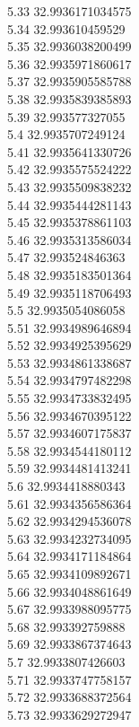 {5.33	32.9936171034575\\
5.34	32.993610459529\\
5.35	32.9936038200499\\
5.36	32.9935971860617\\
5.37	32.9935905585788\\
5.38	32.9935839385893\\
5.39	32.993577327055\\
5.4	32.9935707249124\\
5.41	32.9935641330726\\
5.42	32.9935575524222\\
5.43	32.9935509838232\\
5.44	32.9935444281143\\
5.45	32.9935378861103\\
5.46	32.9935313586034\\
5.47	32.993524846363\\
5.48	32.9935183501364\\
5.49	32.9935118706493\\
5.5	32.9935054086058\\
5.51	32.9934989646894\\
5.52	32.9934925395629\\
5.53	32.9934861338687\\
5.54	32.9934797482298\\
5.55	32.9934733832495\\
5.56	32.9934670395122\\
5.57	32.9934607175837\\
5.58	32.9934544180112\\
5.59	32.9934481413241\\
5.6	32.9934418880343\\
5.61	32.9934356586364\\
5.62	32.9934294536078\\
5.63	32.9934232734095\\
5.64	32.9934171184864\\
5.65	32.9934109892671\\
5.66	32.9934048861649\\
5.67	32.9933988095775\\
5.68	32.993392759888\\
5.69	32.9933867374643\\
5.7	32.9933807426603\\
5.71	32.9933747758157\\
5.72	32.9933688372564\\
5.73	32.9933629272947\\
}
